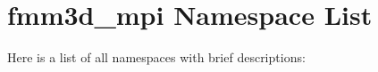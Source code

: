 \section{fmm3d\_\-mpi Namespace List}
Here is a list of all namespaces with brief descriptions:\begin{CompactList}
\item{}
\end{CompactList}
